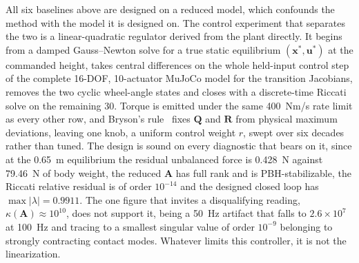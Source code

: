 \documentclass[a4paper,fleqn]{cas-dc}
\begin{document}
All six baselines above are designed on a reduced model, which confounds the
method with the model it is designed on. The control experiment that separates
the two is a linear-quadratic regulator derived from the plant directly. It
begins from a damped Gauss--Newton solve for a true static equilibrium
$(\mathbf{x}^\ast,\mathbf{u}^\ast)$ at the commanded height, takes central
differences on the whole held-input control step of the complete 16-DOF,
10-actuator MuJoCo model for the transition Jacobians, removes the two cyclic
wheel-angle states and closes with a discrete-time Riccati solve on the remaining
\num{30}. Torque is emitted under the same \SI{400}{Nm/s} rate limit as every
other row, and Bryson's rule~\cite{bryson1975optimal} fixes $\mathbf{Q}$ and
$\mathbf{R}$ from physical maximum deviations, leaving one knob, a uniform
control weight $r$, swept over six decades rather than tuned. The design is sound
on every diagnostic that bears on it, since at the \SI{0.65}{m} equilibrium the
residual unbalanced force is \SI{0.428}{N} against \SI{79.46}{N} of body weight,
the reduced $\mathbf{A}$ has full rank and is PBH-stabilizable, the Riccati
relative residual is of order $10^{-14}$ and the designed closed loop has
$\max|\lambda|{=}0.9911$. The one figure that invites a disqualifying reading,
$\kappa(\mathbf{A}){\approx}10^{10}$, does not support it, being a \SI{50}{Hz}
artifact that falls to $2.6{\times}10^{7}$ at \SI{100}{Hz} and tracing to a
smallest singular value of order $10^{-9}$ belonging to strongly contracting
contact modes. Whatever limits this controller, it is not the linearization.
\end{document}
